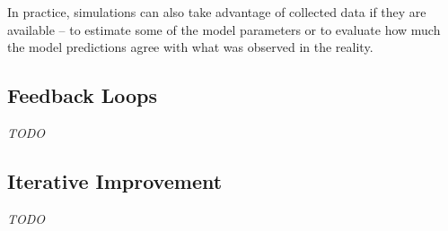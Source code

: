 In practice, simulations can also take advantage of collected data
  if they are available -- to estimate some of the model parameters
  or to evaluate how much the model predictions agree with
  what was observed in the reality.



\subsection{Feedback Loops}

\emph{TODO}



\subsection{Iterative Improvement}
\label{sec:iterative-improvement}

\emph{TODO}

